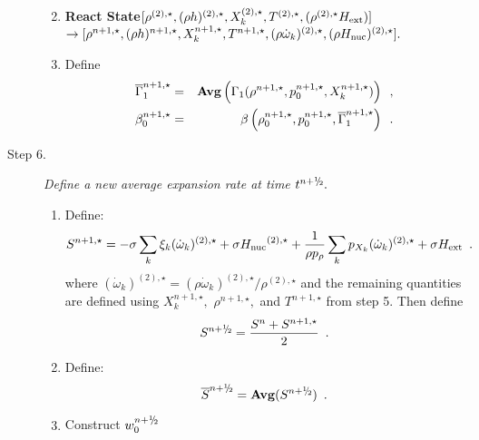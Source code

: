 \documentclass[11pt]{article}
\newcommand{\gammabar}{\overline{\Gamma}_1}
\newcommand{\sfrac}[2]{\mathchoice
  {\kern0em\raise.5ex\hbox{\the\scriptfont0 #1}\kern-.15em/
   \kern-.15em\lower.25ex\hbox{\the\scriptfont0 #2}}
  {\kern0em\raise.5ex\hbox{\the\scriptfont0 #1}\kern-.15em/
   \kern-.15em\lower.25ex\hbox{\the\scriptfont0 #2}}
  {\kern0em\raise.5ex\hbox{\the\scriptscriptfont0 #1}\kern-.2em/
   \kern-.15em\lower.25ex\hbox{\the\scriptscriptfont0 #2}}
  {#1\!/#2}}
\newcommand{\myhalf}{\sfrac{1}{2}}
\newcommand{\nph}{{n + \myhalf}}
\newcommand{\Hext}{{H_{\rm ext}}}
\newcommand{\Hnuc}{{H_{\rm nuc}}}
\newcommand{\omegadot}{\dot{\omega}}
\begin{document}
\begin{description}
\begin{enumerate}
\renewcommand{\theenumi}{{\bf \alph{enumi}}}

\item {\bf React State}$[ \rho^{(2),\star},(\rho h)^{(2),\star}, X_k^{(2),\star}, 
                             T^{(2),\star}, (\rho^{(2),\star} \Hext)] $\\
$\rightarrow [ \rho^{n+1,\star},(\rho h)^{n+1,\star}, X_k^{n+1,\star}, T^{n+1,\star}, 
              (\rho \omegadot_k)^{(2),\star}, (\rho \Hnuc)^{(2),\star} ].$  

\item Define
\begin{eqnarray}
 \gammabar^{n+1,\star}    &=& {\rm{\bf Avg}} \left( \Gamma_1(\rho^{n+1,\star}, p_0^{n+1,\star}, 
                                                      X_k^{n+1,\star}) \right) \enskip , \nonumber \\
 {\beta   }_0^{n+1,\star}    &=& \beta   \left(\rho_0^{n+1,\star}, p_0^{n+1,\star}, \gammabar^{n+1,\star}\right) \enskip .
\end{eqnarray}

\end{enumerate}

\item[Step 6.] {\em Define a new average expansion rate at time $t^\nph.$}

\begin{enumerate}
\renewcommand{\theenumi}{{\bf \alph{enumi}}}
\item Define:
\begin{equation}
  S^{n+1,\star} =  -\sigma  \sum_k  \xi_k  (\omegadot_k)^{(2),\star}  + 
  \sigma \Hnuc^{(2),\star} +
  \frac{1}{\rho p_\rho} \sum_k p_{X_k}  ({\omegadot}_k)^{(2),\star}  
  + \sigma \Hext \enskip .
\end{equation} 
where $(\omegadot_k)^{(2),\star} = (\rho \omegadot_k)^{(2),\star} / \rho^{(2),\star}$
and the remaining quantities are defined using $X_k^{n+1,\star},$ $\rho^{n+1,\star},$ 
and $T^{n+1,\star}$ from step 5.
Then define
\[
 S^\nph = \frac{S^n + S^{n+1,\star}}{2} \enskip. 
\]

\item Define:
\[
\overline{S}^{\nph} = {\mathrm{\bf Avg}} (S^{\nph}) \enskip.
\]

\item Construct $w_0^{\nph}$


\end{enumerate}
\end{description}
\end{document}
